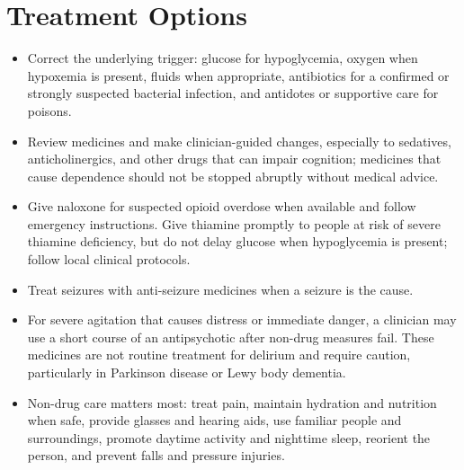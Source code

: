 \section*{Treatment Options}
\begin{itemize}
  \item Correct the underlying trigger: glucose for hypoglycemia, oxygen when hypoxemia is present, fluids when appropriate, antibiotics for a confirmed or strongly suspected bacterial infection, and antidotes or supportive care for poisons.
  \item Review medicines and make clinician-guided changes, especially to sedatives, anticholinergics, and other drugs that can impair cognition; medicines that cause dependence should not be stopped abruptly without medical advice.
  \item Give naloxone for suspected opioid overdose when available and follow emergency instructions. Give thiamine promptly to people at risk of severe thiamine deficiency, but do not delay glucose when hypoglycemia is present; follow local clinical protocols.
  \item Treat seizures with anti-seizure medicines when a seizure is the cause.
  \item For severe agitation that causes distress or immediate danger, a clinician may use a short course of an antipsychotic after non-drug measures fail. These medicines are not routine treatment for delirium and require caution, particularly in Parkinson disease or Lewy body dementia.
  \item Non-drug care matters most: treat pain, maintain hydration and nutrition when safe, provide glasses and hearing aids, use familiar people and surroundings, promote daytime activity and nighttime sleep, reorient the person, and prevent falls and pressure injuries.
\end{itemize}


